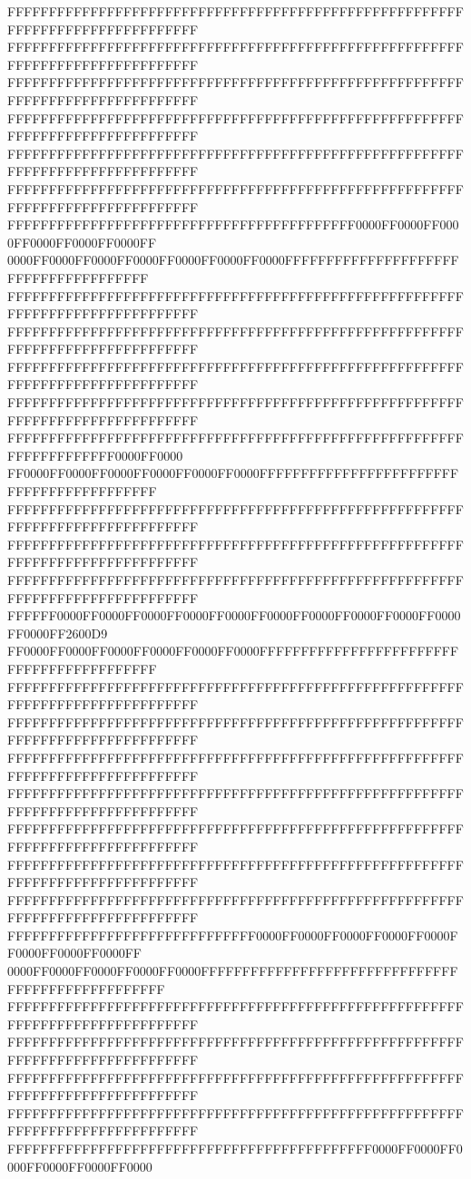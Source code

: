 FFFFFFFFFFFFFFFFFFFFFFFFFFFFFFFFFFFFFFFFFFFFFFFFFFFFFFFFFFFFFFFFFFFFFFFFFFFFFF
FFFFFFFFFFFFFFFFFFFFFFFFFFFFFFFFFFFFFFFFFFFFFFFFFFFFFFFFFFFFFFFFFFFFFFFFFFFFFF
FFFFFFFFFFFFFFFFFFFFFFFFFFFFFFFFFFFFFFFFFFFFFFFFFFFFFFFFFFFFFFFFFFFFFFFFFFFFFF
FFFFFFFFFFFFFFFFFFFFFFFFFFFFFFFFFFFFFFFFFFFFFFFFFFFFFFFFFFFFFFFFFFFFFFFFFFFFFF
FFFFFFFFFFFFFFFFFFFFFFFFFFFFFFFFFFFFFFFFFFFFFFFFFFFFFFFFFFFFFFFFFFFFFFFFFFFFFF
FFFFFFFFFFFFFFFFFFFFFFFFFFFFFFFFFFFFFFFFFFFFFFFFFFFFFFFFFFFFFFFFFFFFFFFFFFFFFF
FFFFFFFFFFFFFFFFFFFFFFFFFFFFFFFFFFFFFFFFFF0000FF0000FF0000FF0000FF0000FF0000FF
0000FF0000FF0000FF0000FF0000FF0000FF0000FFFFFFFFFFFFFFFFFFFFFFFFFFFFFFFFFFFFFF
FFFFFFFFFFFFFFFFFFFFFFFFFFFFFFFFFFFFFFFFFFFFFFFFFFFFFFFFFFFFFFFFFFFFFFFFFFFFFF
FFFFFFFFFFFFFFFFFFFFFFFFFFFFFFFFFFFFFFFFFFFFFFFFFFFFFFFFFFFFFFFFFFFFFFFFFFFFFF
FFFFFFFFFFFFFFFFFFFFFFFFFFFFFFFFFFFFFFFFFFFFFFFFFFFFFFFFFFFFFFFFFFFFFFFFFFFFFF
FFFFFFFFFFFFFFFFFFFFFFFFFFFFFFFFFFFFFFFFFFFFFFFFFFFFFFFFFFFFFFFFFFFFFFFFFFFFFF
FFFFFFFFFFFFFFFFFFFFFFFFFFFFFFFFFFFFFFFFFFFFFFFFFFFFFFFFFFFFFFFFFFFF0000FF0000
FF0000FF0000FF0000FF0000FF0000FF0000FFFFFFFFFFFFFFFFFFFFFFFFFFFFFFFFFFFFFFFFFF
FFFFFFFFFFFFFFFFFFFFFFFFFFFFFFFFFFFFFFFFFFFFFFFFFFFFFFFFFFFFFFFFFFFFFFFFFFFFFF
FFFFFFFFFFFFFFFFFFFFFFFFFFFFFFFFFFFFFFFFFFFFFFFFFFFFFFFFFFFFFFFFFFFFFFFFFFFFFF
FFFFFFFFFFFFFFFFFFFFFFFFFFFFFFFFFFFFFFFFFFFFFFFFFFFFFFFFFFFFFFFFFFFFFFFFFFFFFF
FFFFFF0000FF0000FF0000FF0000FF0000FF0000FF0000FF0000FF0000FF0000FF0000FF2600D9
FF0000FF0000FF0000FF0000FF0000FF0000FFFFFFFFFFFFFFFFFFFFFFFFFFFFFFFFFFFFFFFFFF
FFFFFFFFFFFFFFFFFFFFFFFFFFFFFFFFFFFFFFFFFFFFFFFFFFFFFFFFFFFFFFFFFFFFFFFFFFFFFF
FFFFFFFFFFFFFFFFFFFFFFFFFFFFFFFFFFFFFFFFFFFFFFFFFFFFFFFFFFFFFFFFFFFFFFFFFFFFFF
FFFFFFFFFFFFFFFFFFFFFFFFFFFFFFFFFFFFFFFFFFFFFFFFFFFFFFFFFFFFFFFFFFFFFFFFFFFFFF
FFFFFFFFFFFFFFFFFFFFFFFFFFFFFFFFFFFFFFFFFFFFFFFFFFFFFFFFFFFFFFFFFFFFFFFFFFFFFF
FFFFFFFFFFFFFFFFFFFFFFFFFFFFFFFFFFFFFFFFFFFFFFFFFFFFFFFFFFFFFFFFFFFFFFFFFFFFFF
FFFFFFFFFFFFFFFFFFFFFFFFFFFFFFFFFFFFFFFFFFFFFFFFFFFFFFFFFFFFFFFFFFFFFFFFFFFFFF
FFFFFFFFFFFFFFFFFFFFFFFFFFFFFFFFFFFFFFFFFFFFFFFFFFFFFFFFFFFFFFFFFFFFFFFFFFFFFF
FFFFFFFFFFFFFFFFFFFFFFFFFFFFFF0000FF0000FF0000FF0000FF0000FF0000FF0000FF0000FF
0000FF0000FF0000FF0000FF0000FFFFFFFFFFFFFFFFFFFFFFFFFFFFFFFFFFFFFFFFFFFFFFFFFF
FFFFFFFFFFFFFFFFFFFFFFFFFFFFFFFFFFFFFFFFFFFFFFFFFFFFFFFFFFFFFFFFFFFFFFFFFFFFFF
FFFFFFFFFFFFFFFFFFFFFFFFFFFFFFFFFFFFFFFFFFFFFFFFFFFFFFFFFFFFFFFFFFFFFFFFFFFFFF
FFFFFFFFFFFFFFFFFFFFFFFFFFFFFFFFFFFFFFFFFFFFFFFFFFFFFFFFFFFFFFFFFFFFFFFFFFFFFF
FFFFFFFFFFFFFFFFFFFFFFFFFFFFFFFFFFFFFFFFFFFFFFFFFFFFFFFFFFFFFFFFFFFFFFFFFFFFFF
FFFFFFFFFFFFFFFFFFFFFFFFFFFFFFFFFFFFFFFFFFFF0000FF0000FF0000FF0000FF0000FF0000

